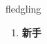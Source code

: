 
\begin{frame}
{\huge fledgling}
\begin{center}
\begin{enumerate}\Large
  \item \textbf{新手}
\end{enumerate}
\end{center}
\end{frame}

